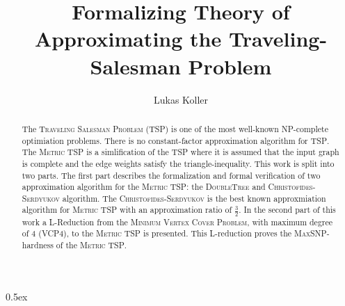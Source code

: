 \documentclass[11pt,a4paper]{article}
\begin{document}
\title{Formalizing Theory of Approximating the Traveling-Salesman Problem}
\author{Lukas Koller}
\maketitle

\begin{abstract}
  The \textsc{Traveling Salesman Problem} (\textsc{TSP}) is one of the most well-known \textsc{NP}-complete optimiation problems. There is no constant-factor approximation algorithm for \textsc{TSP}. The \textsc{Metric TSP} is a simlification of the \textsc{TSP} where it is assumed that the input graph is complete and the edge weights satisfy the triangle-inequality. This work is split into two parts. The first part describes the formalization and formal verification of two approximation algorithm for the \textsc{Metric TSP}: the \textsc{DoubleTree} and \textsc{Christofides-Serdyukov} algorithm. The \textsc{Christofides-Serdyukov} is the best known approxmiation algorithm for \textsc{Metric TSP} with an approximation ratio of $\frac{3}{2}$. 
  In the second part of this work a L-Reduction from the \textsc{Minimum Vertex Cover Problem}, with maximum degree of 4 (\textsc{VCP4}), to the \textsc{Metric TSP} is presented. This L-reduction proves the \textsc{MaxSNP}-hardness of the \textsc{Metric TSP}.
\end{abstract}

\tableofcontents

\parindent 0pt\parskip 0.5ex





\end{document}
